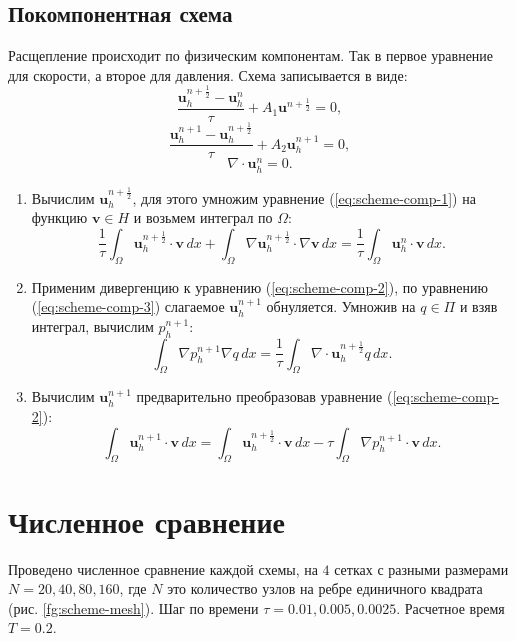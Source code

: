 \documentclass[12pt]{article}
\begin{document}
\subsection{Покомпонентная схема} 
Расщепление происходит по физическим компонентам. Так в первое уравнение для скорости, а второе для давления. Схема записывается в виде:
\begin{equation} \label{eq:scheme-comp-1}
\frac{{\bm u}_h^{n+\frac{1}{2}}-{\bm u}_h^n}{\tau} + A_1 {\bm u}^{n+\frac{1}{2}}=0,
\end{equation} 
\begin{equation} \label{eq:scheme-comp-2}
\frac{{\bm u}_h^{n+1}-{\bm u}_h^{n+\frac{1}{2}}}{\tau} + A_2 {\bm u}_h^{n+1}=0,
\end{equation}
\begin{equation} \label{eq:scheme-comp-3}
\nabla \cdot {\bm u}_h^n = 0.
\end{equation}
\begin{enumerate}
\item 
Вычислим ${\bm u}_h^{n+\frac{1}{2}}$, для этого умножим уравнение (\ref{eq:scheme-comp-1}) на функцию ${\bm v} \in H$ и возьмем интеграл по $\Omega$:
$$
\frac{1}{\tau}\int_{\Omega} {\bm u}_h^{n+\frac{1}{2}}\cdot {\bm v} \,dx + \int_{\Omega} \nabla {\bm u}_h^{n+\frac{1}{2}} \cdot \nabla {\bm v} \,dx = \frac{1}{\tau} \int_{\Omega} {\bm u}_h^{n} \cdot {\bm v} \,dx.
$$
\item 
Применим дивергенцию к уравнению (\ref{eq:scheme-comp-2}), по уравнению (\ref{eq:scheme-comp-3}) слагаемое ${\bm u}_h^{n+1}$ обнуляется. Умножив на $q \in \Pi$ и взяв интеграл, вычислим $p_h^{n+1}$:
$$
\int_{\Omega} \nabla p_h^{n+1} \nabla q \,dx = \frac{1}{\tau} \int_{\Omega} \nabla \cdot {\bm u}_h^{n+\frac{1}{2}} q \,dx.
$$
\item 
Вычислим ${\bm u}_h^{n+1}$ предварительно преобразовав уравнение (\ref{eq:scheme-comp-2}):
$$
\int_{\Omega} {\bm u}_h^{n+1} \cdot {\bm v}\,dx = \int_{\Omega} {\bm u}_h^{n+\frac{1}{2}} \cdot {\bm v} \, dx - \tau \int_{\Omega} \nabla p_h^{n+1} \cdot {\bm v} \,dx.
$$
\end{enumerate}

\section{Численное сравнение}
Проведено численное сравнение каждой схемы, на $4$ сетках  с разными размерами $N = 20, 40, 80, 160$, где $N$ это количество узлов на ребре единичного квадрата (рис. \ref{fg:scheme-mesh}). Шаг по времени $\tau = 0.01, 0.005, 0.0025$. Расчетное время $T=0.2$.
\end{document}
